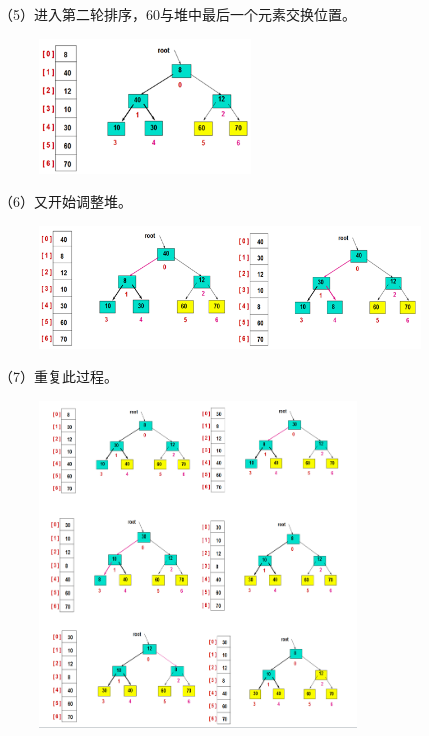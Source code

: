 （5）进入第二轮排序，60与堆中最后一个元素交换位置。
\begin{figure}[h]
\begin{center}
\includegraphics[width=0.5\textwidth]{pictures/heapsort4.png}
\end{center}
\end{figure}


（6）又开始调整堆。
\begin{figure}[h]
\begin{center}
\includegraphics[width=0.9\textwidth]{pictures/heapsort5.png}
\end{center}
\end{figure}

\newpage
（7）重复此过程。
\begin{figure}[h]
\begin{center}
\includegraphics[width=0.75\textwidth]{pictures/2012113021474819.png}
\end{center}
\end{figure}

